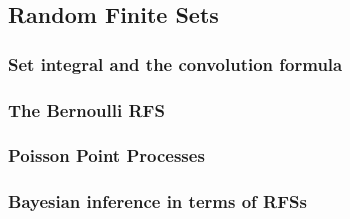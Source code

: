 \subsection{Random Finite Sets}

\subsubsection{Set integral and the convolution formula}

\subsubsection{The Bernoulli RFS}

\subsubsection{Poisson Point Processes}

\subsubsection{Bayesian inference in terms of RFSs}

